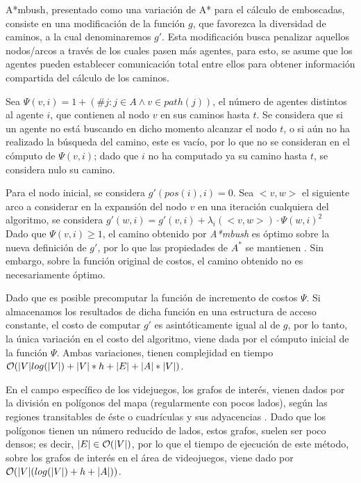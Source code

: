 A*mbush, presentado como una variaci\'on de A* para el c\'alculo
de emboscadas, consiste en una modificación de la función $g$, que
favorezca la diversidad de caminos, a la cual denominaremos $g'$.
Esta modificaci\'on busca penalizar aquellos nodos/arcos a trav\'es
de los cuales pasen m\'as agentes, para esto, se asume que los
agentes pueden establecer comunicaci\'on total entre ellos para
obtener informaci\'on compartida del c\'alculo de los caminos.

Sea $\Psi(v,i) = 1+(\# j : j \in A \wedge v \in path(j))$,
el número de agentes distintos al agente $i$, que contienen al
nodo $v$ en sus caminos hasta $t$. Se considera que si un agente
no está buscando en dicho momento alcanzar el nodo $t$, o si
aún no ha realizado la búsqueda del camino, este es vacío, por
lo que no se consideran en el cómputo de $\Psi(v,i)$; dado
que $i$ no ha computado ya su camino hasta $t$, se considera
nulo su camino.

Para el nodo inicial, se considera $g'(pos(i),i) = 0$.
Sea $<v,w>$ el siguiente arco a considerar en la expansión del
nodo $v$ en una iteración cualquiera del algoritmo, se considera
$g'(w, i) = g'(v,i) + \lambda_i(<v,w>) \cdot \Psi(w,i)^2$\\

Dado que $\Psi(v,i) \geq 1$, el camino obtenido por \textit{A*mbush}
es óptimo sobre la nueva definición de $g'$, por lo que las
propiedades de $A^*$ se mantienen \cite{HNR72}. Sin embargo, sobre
la función original de costos, el camino obtenido no es necesariamente
óptimo.

Dado que es posible precomputar la funci\'on de incremento de
costos $\Psi$. Si almacenamos los resultados de dicha funci\'on
en una estructura de acceso constante, el costo de computar $g'$
es asintóticamente igual al de $g$, por lo tanto, la única
variación en el costo del algoritmo, viene dada por el
cómputo inicial de la función $\Psi$. Ambas variaciones, tienen
complejidad en tiempo
$\mathcal{O}(|V|log(|V|) + |V|*h + |E| + |A|*|V| )$.

En el campo específico de los videjuegos, los grafos
de interés, vienen dados por la división en polígonos
del mapa
\cite{MF09} \cite{CS11}
(regularmente con pocos lados), según las
regiones transitables de éste o cuadrículas y sus
adyacencias \cite{MF09} \cite{CS11}.
Dado que los polígonos tienen un número
reducido de lados, estos grafos, suelen ser poco densos;
es decir, $|E| \in \mathcal{O}(|V|)$, por lo que el tiempo
de ejecución de este método, sobre los grafos de interés
en el área de videojuegos, viene dado por
$\mathcal{O}(|V|(log(|V|) + h + |A|) )$.

